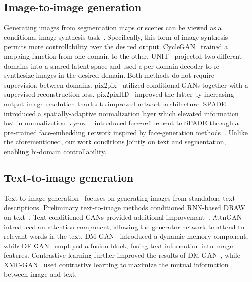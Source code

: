 \documentclass[final]{cvpr}
\begin{document}
\subsection{Image-to-image generation} Generating images from segmentation maps or scenes can be viewed as a conditional image synthesis task~\cite{zhu2017unpaired,liu2017unsupervised,isola2017image,wang2018video,wang2018high,park2019semantic}. Specifically, this form of image synthesis permits more controllability over the desired output. CycleGAN~\cite{zhu2017unpaired} trained a mapping function from one domain to the other. UNIT~\cite{liu2017unsupervised} projected two different domains into a shared latent space and used a per-domain decoder to re-synthesize images in the desired domain. Both methods do not require supervision between domains. pix2pix~\cite{isola2017image} utilized conditional GANs together with a supervised reconstruction loss. pix2pixHD~\cite{wang2018high} improved the latter by increasing output image resolution thanks to improved network architecture. SPADE~\cite{park2019semantic} introduced a spatially-adaptive normalization layer which elevated information lost in normalization layers. ~\cite{gafni2021single} introduced face-refinement to SPADE through a pre-trained face-embedding network inspired by face-generation methods~\cite{gafni2019live}. Unlike the aforementioned, our work conditions jointly on text and segmentation, enabling bi-domain controllability.

\subsection{Text-to-image generation} Text-to-image generation~\cite{xu2018attngan,zhu2019dm,tao2020df,ye2021improving,zhang2021cross,ramesh2021zero,ding2021cogview,nichol2021glide,zhou2021lafite} focuses on generating images from standalone text descriptions. Preliminary text-to-image methods conditioned RNN-based DRAW~\cite{gregor2015draw} on text~\cite{mansimov2015generating}. Text-conditioned GANs provided additional improvement~\cite{reed2016generative}. AttnGAN~\cite{xu2018attngan} introduced an attention component, allowing the generator network to attend to relevant words in the text. DM-GAN~\cite{zhu2019dm} introduced a dynamic memory component, while DF-GAN~\cite{tao2020df} employed a fusion block, fusing text information into image features. Contrastive learning further improved the results of DM-GAN~\cite{ye2021improving}, while XMC-GAN~\cite{zhang2021cross} used contrastive learning to maximize the mutual information between image and text. 
\end{document}
